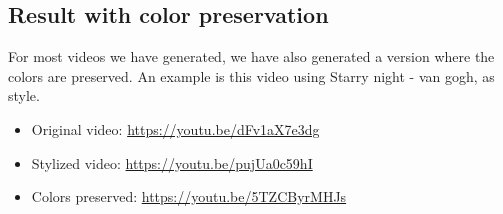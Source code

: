 \subsection{Result with color preservation}
\label{sec:color_preserve_result}
For most videos we have generated, we have also generated a version where the colors are preserved. An example is this video using Starry night - van gogh, as style.
\begin{itemize}
\item{Original video: \url{https://youtu.be/dFv1aX7e3dg}}
\item{Stylized video: \url{https://youtu.be/pujUa0c59hI}}
\item{Colors preserved: \url{https://youtu.be/5TZCByrMHJs}}
\end{itemize}